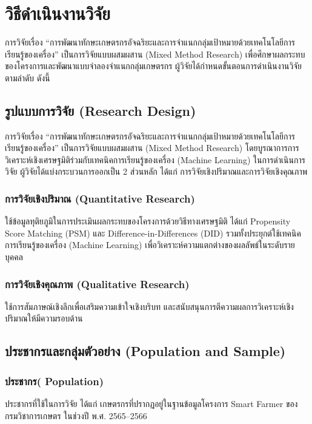 \chapter{วิธีดำเนินงานวิจัย}
การวิจัยเรื่อง ``การพัฒนาทักษะเกษตรกรอัจฉริยะและการจำแนกกลุ่มเป้าหมายด้วยเทคโนโลยีการเรียนรู้ของเครื่อง'' 
เป็นการวิจัยแบบผสมผสาน (Mixed Method Research) เพื่อศึกษาผลกระทบของโครงการและพัฒนาแบบจำลองจำแนกกลุ่มเกษตรกร 
ผู้วิจัยได้กำหนดขั้นตอนการดำเนินงานวิจัยตามลำดับ ดังนี้

\section{รูปแบบการวิจัย (Research Design)}
การวิจัยเรื่อง “การพัฒนาทักษะเกษตรกรอัจฉริยะและการจำแนกกลุ่มเป้าหมายด้วยเทคโนโลยีการเรียนรู้ของเครื่อง” 
เป็นการวิจัยแบบผสมผสาน (Mixed Method Research) โดยบูรณาการการวิเคราะห์เชิงเศรษฐมิติร่วมกับเทคนิคการเรียนรู้ของเครื่อง (Machine Learning) 
ในการดำเนินการวิจัย ผู้วิจัยได้แบ่งกระบวนการออกเป็น 2 ส่วนหลัก ได้แก่ การวิจัยเชิงปริมาณและการวิจัยเชิงคุณภาพ

\subsection{การวิจัยเชิงปริมาณ (Quantitative Research)}

ใช้ข้อมูลทุติยภูมิในการประเมินผลกระทบของโครงการด้วยวิธีทางเศรษฐมิติ ได้แก่ 
Propensity Score Matching (PSM) และ Difference-in-Differences (DID) 
รวมทั้งประยุกต์ใช้เทคนิคการเรียนรู้ของเครื่อง (Machine Learning) 
เพื่อวิเคราะห์ความแตกต่างของผลลัพธ์ในระดับรายบุคคล

\subsection{การวิจัยเชิงคุณภาพ (Qualitative Research)}

ใช้การสัมภาษณ์เชิงลึกเพื่อเสริมความเข้าใจเชิงบริบท 
และสนับสนุนการตีความผลการวิเคราะห์เชิงปริมาณให้มีความรอบด้าน

\section{ประชากรและกลุ่มตัวอย่าง (Population and Sample)}

\subsection{ประชากร( Population)}  
ประชากรที่ใช้ในการวิจัย ได้แก่ เกษตรกรที่ปรากฏอยู่ในฐานข้อมูลโครงการ Smart Farmer ของกรมวิชาการเกษตร ในช่วงปี พ.ศ. 2565–2566

